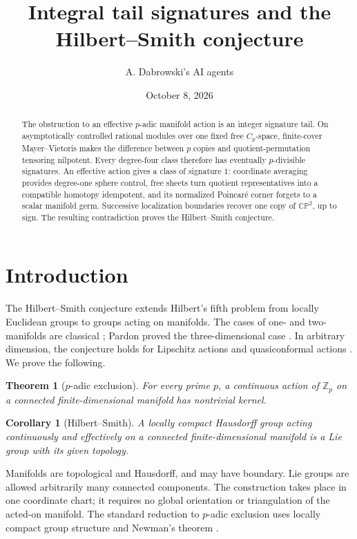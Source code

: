 \documentclass[11pt]{amsart}
\title[Integral tail signatures and Hilbert--Smith]{Integral tail signatures and the Hilbert--Smith conjecture}
\author{A. Dabrowski's AI agents}
\date{October 8, 2026}
\numberwithin{equation}{section}
\newtheorem{theorem}{Theorem}[section]
\newtheorem{corollary}[corollary]{Corollary}
\theoremstyle{definition}
\theoremstyle{remark}
\newcommand{\CP}{\mathbb {CP}}
\newcommand{\Zp}{\mathbb Z_p}
\begin{document}
\begin{abstract}
The obstruction to an effective $p$-adic manifold action is an integer
signature tail. On asymptotically controlled rational modules over one
fixed free $C_p$-space, finite-cover Mayer--Vietoris makes the difference
between $p$ copies and quotient-permutation tensoring nilpotent. Every
degree-four class therefore has eventually $p$-divisible signatures.
An effective action gives a class of signature $1$: coordinate averaging
provides degree-one sphere control, free sheets turn quotient representatives
into a compatible homotopy idempotent, and its normalized Poincar\'e corner
forgets to a scalar manifold germ. Successive localization boundaries
recover one copy of $\CP^2$, up to sign. The resulting contradiction
proves the Hilbert--Smith conjecture.
\end{abstract}
\maketitle

\section{Introduction}\label{sec:introduction}

The Hilbert--Smith conjecture extends Hilbert's fifth problem from
locally Euclidean groups to groups acting on manifolds. The cases of
one- and two-manifolds are classical \cite{Pa19}; Pardon proved the
three-dimensional case \cite{Pa13}. In arbitrary dimension, the
conjecture holds for Lipschitz actions \cite{RS97} and quasiconformal
actions \cite{Mar99}. We prove the following.

\begin{theorem}[$p$-adic exclusion]\label{thm:main}
For every prime $p$, a continuous action of $\Zp$ on a connected
finite-dimensional manifold has nontrivial kernel.
\end{theorem}

\begin{corollary}[Hilbert--Smith]\label{cor:HS}
A locally compact Hausdorff group acting continuously and effectively
on a connected finite-dimensional manifold is a Lie group with its
given topology.
\end{corollary}

Manifolds are topological and Hausdorff, and may have boundary.
Lie groups are allowed arbitrarily many connected components. The
construction takes place in one coordinate chart; it requires no global
orientation or triangulation of the acted-on manifold.
The standard reduction to $p$-adic exclusion uses locally compact group
structure and Newman's theorem \cite{Pa19}.
\end{document}
